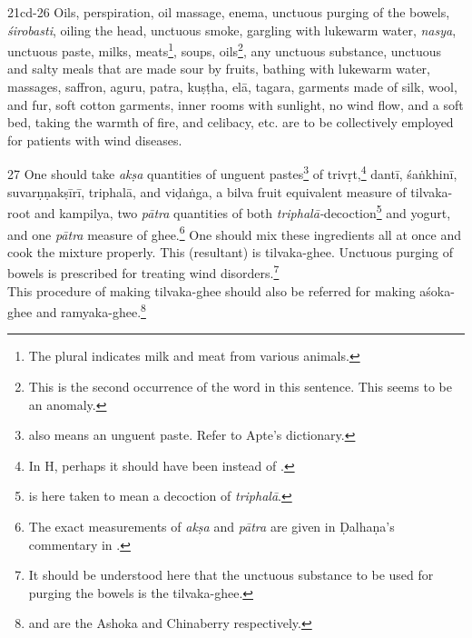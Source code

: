 \begin{translation}
\begin{tt}
    \item[21cd-26]
    Oils, perspiration, oil massage, enema, unctuous purging of the bowels, 
    \textit{śirobasti}, oiling the head, unctuous smoke, gargling with lukewarm 
    water, \textit{nasya}, unctuous paste, milks, 
    meats\footnote{The plural indicates milk and meat from various animals.}, 
    soups, oils\footnote{This is the second occurrence of the word 
     in this sentence. This seems to be an anomaly.}, any 
    unctuous substance, unctuous and salty meals that are made sour by fruits, 
    bathing with lukewarm water, massages, saffron, \gls{aguru}, \gls{patra}, 
    \gls{kuṣṭha}, \gls{elā}, \gls{tagara}, garments made of silk, wool, and fur, 
    soft cotton garments, inner rooms with sunlight, no wind flow, and a soft 
    bed, taking the warmth of fire, and celibacy, etc. are to be collectively 
    employed for patients with wind diseases.    

    \item[27]
    One should take \textit{akṣa} quantities of unguent 
    pastes\footnote{ also means an unguent paste. Refer to Apte's 
    dictionary.} of \gls{trivṛt},\footnote{In H, perhaps it should have been 
     instead of .} \gls{dantī}, \gls{śaṅkhinī}, 
    \gls{suvarṇṇakṣīrī}, \gls{triphalā}, and \gls{viḍaṅga}, a \gls{bilva} fruit 
    equivalent measure of \gls{tilvaka}-root and \gls{kampilya}, two 
    \textit{pātra} quantities of both 
    \textit{triphalā-}decoction\footnote{ is here taken to 
    mean 
    a decoction of \textit{triphalā}.} and yogurt, and one \textit{pātra} 
    measure 
    of ghee.\footnote{The exact measurements of \textit{akṣa} and 
    \textit{pātra} 
    are given in Ḍalhaṇa's commentary in \cite[422]{vulgate}.} One should mix 
    these ingredients all at once and cook the mixture properly. This (resultant) 
    is 
    \gls{tilvaka}-ghee. Unctuous purging of bowels is prescribed for treating 
    wind 
    disorders.\footnote{It should be understood here that the unctuous 
    substance 
    to be used for purging the bowels is the \gls{tilvaka}-ghee.}\\
    This procedure of making \gls{tilvaka}-ghee should also be referred for 
    making \gls{aśoka}-ghee and \gls{ramyaka}-ghee.\footnote{ 
    and  are the Ashoka and Chinaberry respectively.}


\end{tt}
\end{translation}

